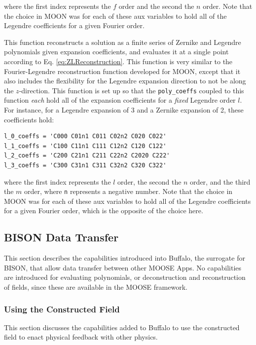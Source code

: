 \documentclass[10pt]{article}
\newcounter{subsubsubsection}[subsubsection]
\numberwithin{equation}{section} %
\begin{document}
where the first index represents the \(f\) order and the second the \(n\) order. Note that the choice in MOON was for each of these aux variables to hold all of the Legendre coefficients for a given Fourier order.

This function reconstructs a solution as a finite series of Zernike and Legendre polynomials given expansion coefficients, and evaluates it at a single point according to Eq. \eqref{eq:ZLReconstruction}. This function is very similar to the Fourier-Legendre reconstruction function developed for MOON, except that it also includes the flexibility for the Legendre expansion direction to not be along the \(z\)-direction. This function is set up so that the {\tt poly\_coeffs} coupled to this function {\it each} hold all of the expansion coefficients for a {\it fixed} Legendre order \(l\). For instance, for a Legendre expansion of 3 and a Zernike expansion of 2, these coefficients hold:

\begin{lstlisting}
l_0_coeffs = 'C000 C01n1 C011 C02n2 C020 C022'
l_1_coeffs = 'C100 C11n1 C111 C12n2 C120 C122'
l_2_coeffs = 'C200 C21n1 C211 C22n2 C2020 C222'
l_3_coeffs = 'C300 C31n1 C311 C32n2 C320 C322'
\end{lstlisting}

where the first index represents the \(l\) order, the second the \(n\) order, and the third the \(m\) order, where {\tt n} represents a negative number. Note that the choice in MOON was for each of these aux variables to hold all of the Legendre coefficients for a given Fourier order, which is the opposite of the choice here. 

\subsection{BISON Data Transfer}
This section describes the capabilities introduced into Buffalo, the surrogate for BISON, that allow data transfer between other MOOSE Apps. No capabilities are introduced for evaluating polynomials, or deconstruction and reconstruction of fields, since these are available in the MOOSE framework.

\subsubsection{Using the Constructed Field}
This section discusses the capabilities added to Buffalo to use the constructed field to enact physical feedback with other physics.
\end{document}
